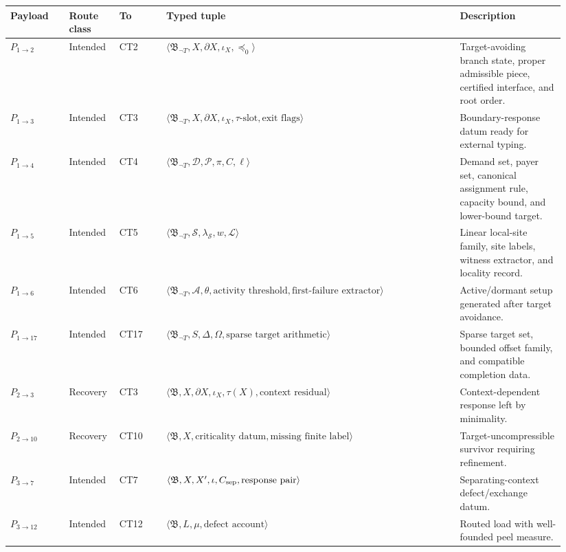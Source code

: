 \documentclass[
  11pt,
]{article}
\theoremstyle{definition}
\begin{document}
\begingroup
\tiny
\setlength{\tabcolsep}{1pt}
\begin{longtable}[]{@{}
  >{\raggedright\arraybackslash}p{0.10\linewidth}
  >{\raggedright\arraybackslash}p{0.08\linewidth}
  >{\raggedright\arraybackslash}p{0.08\linewidth}
  >{\raggedright\arraybackslash}p{0.50\linewidth}
  >{\raggedright\arraybackslash}p{0.18\linewidth}@{}}
\toprule\noalign{}
Payload & Route class & To & Typed tuple & Description \\
\midrule\noalign{}
\endhead
\bottomrule\noalign{}
\endlastfoot
\(P_{1\to2}\) & Intended & CT2 & \(\langle\mathfrak B_{\neg T},X,\partial X,\iota_X,\preceq_0\rangle\) & Target-avoiding branch state, proper admissible piece, certified interface, and root order. \\
\(P_{1\to3}\) & Intended & CT3 & \(\langle\mathfrak B_{\neg T},X,\partial X,\iota_X,\tau\text{-slot},\text{exit flags}\rangle\) & Boundary-response datum ready for external typing. \\
\(P_{1\to4}\) & Intended & CT4 & \(\langle\mathfrak B_{\neg T},\mathcal D,\mathcal P,\pi,C,\ell\rangle\) & Demand set, payer set, canonical assignment rule, capacity bound, and lower-bound target. \\
\(P_{1\to5}\) & Intended & CT5 & \(\langle\mathfrak B_{\neg T},\mathcal S,\lambda_{\mathcal S},w,\mathcal L\rangle\) & Linear local-site family, site labels, witness extractor, and locality record. \\
\(P_{1\to6}\) & Intended & CT6 & \(\langle\mathfrak B_{\neg T},\mathcal A,\theta,\text{activity threshold},\text{first-failure extractor}\rangle\) & Active/dormant setup generated after target avoidance. \\
\(P_{1\to17}\) & Intended & CT17 & \(\langle\mathfrak B_{\neg T},S,\Delta,\Omega,\text{sparse target arithmetic}\rangle\) & Sparse target set, bounded offset family, and compatible completion data. \\
\(P_{2\to3}\) & Recovery & CT3 & \(\langle\mathfrak B,X,\partial X,\iota_X,\tau(X),\text{context residual}\rangle\) & Context-dependent response left by minimality. \\
\(P_{2\to10}\) & Recovery & CT10 & \(\langle\mathfrak B,X,\text{criticality datum},\text{missing finite label}\rangle\) & Target-uncompressible survivor requiring refinement. \\
\(P_{3\to7}\) & Intended & CT7 & \(\langle\mathfrak B,X,X',\iota,C_{\rm sep},\text{response pair}\rangle\) & Separating-context defect/exchange datum. \\
\(P_{3\to12}\) & Intended & CT12 & \(\langle\mathfrak B,L,\mu,\text{defect account}\rangle\) & Routed load with well-founded peel measure. \\

\end{longtable}
\end{document}
